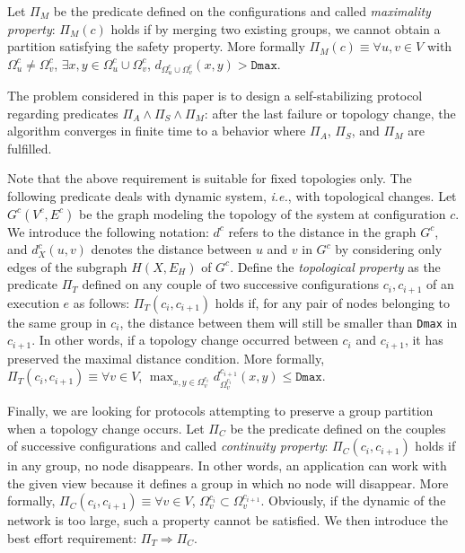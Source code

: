 \documentclass[11pt,english]{article}
\begin{document}
Let $\Pi_M$ be the predicate defined on the configurations and called
\emph{maximality property}: $\Pi_M(c)$ holds if by merging two existing groups,
we cannot obtain a partition satisfying the safety property. More formally
$\Pi_M(c) \equiv \forall u,v \in V$ with $\Omega_u^c \neq \Omega_v^c$, $\exists
x,y \in \Omega_u^c \cup \Omega_v^c$, $d_{\Omega_u^c \cup \Omega_v^c}(x,y) >
\texttt{Dmax}$.

The problem considered in this paper is to design a self-stabilizing protocol
regarding predicates $\Pi_A \wedge \Pi_S \wedge \Pi_M$: after the last failure
or topology change, the algorithm converges in finite time to a behavior where
$\Pi_A$, $\Pi_S$, and $\Pi_M$ are fulfilled.

Note that the above requirement is suitable for fixed topologies only.  The
following predicate deals with dynamic system, {\it i.e.}, with topological
changes.
Let $G^c(V^c,E^c)$ be the graph modeling the topology of the system at
configuration $c$. We introduce the following notation: $d^c$ refers to the
distance in the graph $G^c$, and $d_X^c(u,v)$ denotes the
distance between $u$ and $v$ in $G^{c}$ by considering only edges of the
subgraph $H(X,E_H)$ of $G^c$.
Define the {\em topological property} as the predicate $\Pi_T$ defined on any
couple of two successive configurations $c_i, c_{i+1}$ of an execution $e$ as
follows: $\Pi_T(c_i, c_{i+1})$ holds if, for any pair of nodes belonging to the
same group in $c_i$, the distance between them will still be smaller than
\texttt{Dmax} in $c_{i+1}$. In other words, if a topology change occurred
between $c_i$ and $c_{i+1}$, it has preserved the maximal distance condition.
More formally, $\Pi_T(c_i, c_{i+1}) \equiv \forall v \in V$, $\max_{x,y \in
  \Omega_v^{c_i}} d_{\Omega_v^{c_i}}^{c_{i+1}}(x,y) \leq \texttt{Dmax}$.

Finally, we are looking for protocols attempting to preserve a group partition when a topology change occurs. 
Let $\Pi_C$ be the predicate defined on the couples of successive configurations
and called \emph{continuity property}: $\Pi_C(c_i,c_{i+1})$ holds if in any
group, no node disappears. In other words, an application can work with the
given view because it defines a group in which no node will disappear. More
formally, $\Pi_C(c_i,c_{i+1}) \equiv \forall v \in V$, $\Omega_v^{c_i}
\subset \Omega_v^{c_{i+1}}$.
Obviously, if the dynamic of the network is too large, such a property cannot be
satisfied.  We then introduce the best effort requirement: $\Pi_T \Rightarrow \Pi_C$.
\end{document}
